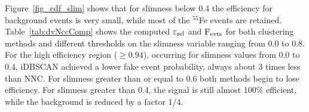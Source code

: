 \documentclass[a4paper,11pt]{article}
\begin{document}
Figure~\ref{fig_cdf_slim} shows that for slimness below 0.4
the efficiency for background events is very small, while most of the $^{55}$Fe events are retained.
Table~\ref{tab:dvNccComp} shows the computed $\rm \varepsilon_{sel}$ and $\rm F_{evts}$ for both clustering methods and different thresholds on the slimness variable ranging from 0.0 to 0.8.  For the high efficiency region ($\geq 0.94$), occurring for slimness values from 0.0 to 0.4, iDBSCAN achieved a lower fake event probability, always about 3 times less than NNC. For slimness greater than or equal to 0.6 both methods begin to lose efficiency.
For slimness greater than 0.4, the signal is still almost 100$\%$ efficient, while the background is reduced by a factor 1/4.
\end{document}
